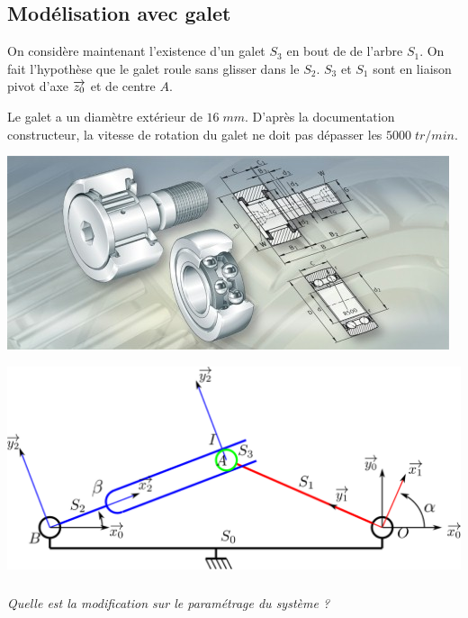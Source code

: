 \documentclass[10pt,oneside]{article}
\begin{document}
\subsection*{Modélisation avec galet}
\begin{minipage}[c]{.4\linewidth}
On considère maintenant l'existence d'un galet $S_3$ en bout de de l'arbre $S_1$. On fait l'hypothèse que le galet roule sans glisser dans le $S_2$. $S_3$ et $S_1$ sont en liaison pivot d'axe $\overrightarrow{z_0}$ et de centre $A$.

Le galet a un diamètre extérieur de $16\;mm$. D'après la documentation constructeur, la vitesse de rotation du galet ne doit pas dépasser les $5000\; tr/min$.
\end{minipage} \hfill
\begin{minipage}[c]{.55\linewidth}
\begin{center}
 \includegraphics[width=\textwidth]{png/galet}
\end{center}
\end{minipage}

\begin{center}
 \includegraphics[width=.9\textwidth]{png/schema2}
\end{center}

\subparagraph{}
\textit{Quelle est la modification sur le paramétrage du système ?}
{}
\end{document}
